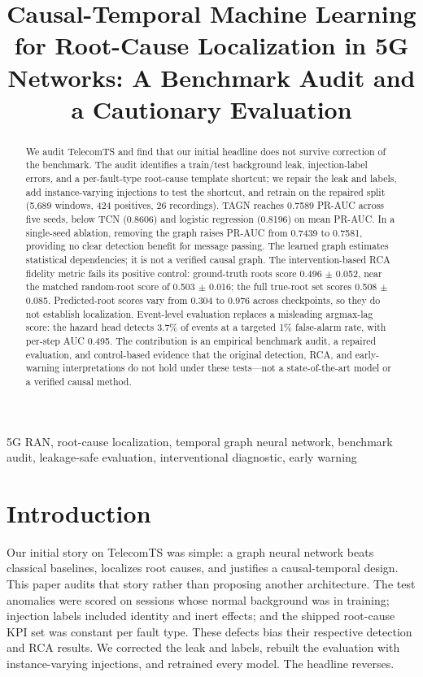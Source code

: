 \documentclass[conference]{IEEEtran}
\title{Causal-Temporal Machine Learning for Root-Cause Localization in 5G Networks: A Benchmark Audit and a Cautionary Evaluation}
\author{
\IEEEauthorblockN{Nagi Reddy SaiBaba}
\IEEEauthorblockA{Reg. No. 23BDS0019\\
Vellore Institute of Technology\\
Vellore, India}
\and
\IEEEauthorblockN{Arya Diwakar}
\IEEEauthorblockA{Reg. No. 23BDS0023\\
Vellore Institute of Technology\\
Vellore, India}
\and
\IEEEauthorblockN{Jeswanth G}
\IEEEauthorblockA{Reg. No. 23BDS0212\\
Vellore Institute of Technology\\
Vellore, India}
}
\begin{document}
\maketitle

\begin{abstract}
We audit TelecomTS and find that our initial headline does not survive correction of the benchmark. The audit identifies a train/test background leak, injection-label errors, and a per-fault-type root-cause template shortcut; we repair the leak and labels, add instance-varying injections to test the shortcut, and retrain on the repaired split (5,689 windows, 424 positives, 26 recordings). TAGN reaches 0.7589 PR-AUC across five seeds, below TCN (0.8606) and logistic regression (0.8196) on mean PR-AUC. In a single-seed ablation, removing the graph raises PR-AUC from 0.7439 to 0.7581, providing no clear detection benefit for message passing. The learned graph estimates statistical dependencies; it is not a verified causal graph. The intervention-based RCA fidelity metric fails its positive control: ground-truth roots score 0.496 $\pm$ 0.052, near the matched random-root score of 0.503 $\pm$ 0.016; the full true-root set scores 0.508 $\pm$ 0.085. Predicted-root scores vary from 0.304 to 0.976 across checkpoints, so they do not establish localization. Event-level evaluation replaces a misleading argmax-lag score: the hazard head detects 3.7\% of events at a targeted 1\% false-alarm rate, with per-step AUC 0.495. The contribution is an empirical benchmark audit, a repaired evaluation, and control-based evidence that the original detection, RCA, and early-warning interpretations do not hold under these tests—not a state-of-the-art model or a verified causal method.
\end{abstract}

\begin{IEEEkeywords}
5G RAN, root-cause localization, temporal graph neural network, benchmark audit, leakage-safe evaluation, interventional diagnostic, early warning
\end{IEEEkeywords}

\section{Introduction}

Our initial story on TelecomTS was simple: a graph neural network beats classical baselines, localizes root causes, and justifies a causal-temporal design. This paper audits that story rather than proposing another architecture. The test anomalies were scored on sessions whose normal background was in training; injection labels included identity and inert effects; and the shipped root-cause KPI set was constant per fault type. These defects bias their respective detection and RCA results. We corrected the leak and labels, rebuilt the evaluation with instance-varying injections, and retrained every model. The headline reverses.
\end{document}

